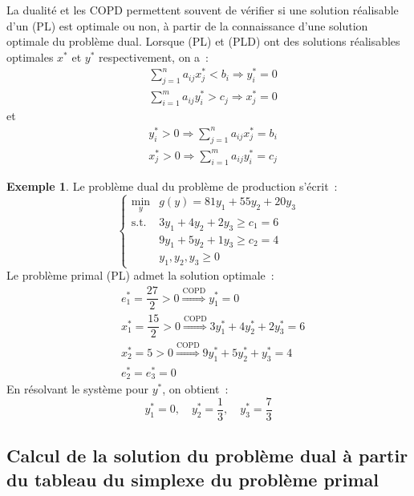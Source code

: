 \documentclass[a4paper,12pt,openany]{book}
\theoremstyle{plain}
\theoremstyle{definition}
\newtheorem{exemple}[theorem]{Exemple}
\theoremstyle{remark}
\theoremstyle{nbstyle}
\begin{document}
	La dualité et les COPD permettent souvent de vérifier si une solution réalisable d'un (PL) est optimale ou non, à partir de la connaissance d'une solution optimale du problème dual. Lorsque (PL) et (PLD) ont des solutions réalisables optimales $x^{*}$ et $y^{*}$ respectivement, on a~:
	\[
	\begin{aligned}
	& \displaystyle\sum_{j=1}^{n} a_{ij} x_{j}^{*} < b_{i} \Longrightarrow y_{i}^{*} = 0 \\
	& \displaystyle\sum_{i=1}^{m} a_{ij} y_{i}^{*} > c_{j} \Longrightarrow x_{j}^{*} = 0
	\end{aligned}
	\]
	et
	\[
	\begin{aligned}
	& y_{i}^{*} > 0 \Longrightarrow \displaystyle\sum_{j=1}^{n} a_{ij} x_{j}^{*} = b_{i} \\
	& x_{j}^{*} > 0 \Longrightarrow \displaystyle\sum_{i=1}^{m} a_{ij} y_{i}^{*} = c_{j}
	\end{aligned}
	\]
	
	\begin{exemple}
		Le problème dual du problème de production s'écrit~:
		\[
		\left\{
		\begin{array}{ll}
		\displaystyle\min_{y} & g(y) = 81 y_{1} + 55 y_{2} + 20 y_{3} \\
		\text{s.t.} & 3 y_{1} + 4 y_{2} + 2 y_{3} \geq c_{1} = 6 \\
		& 9 y_{1} + 5 y_{2} + 1 y_{3} \geq c_{2} = 4 \\
		& y_{1}, y_{2}, y_{3} \geq 0
		\end{array}
		\right.
		\]
		Le problème primal (PL) admet la solution optimale~:
		\[
		\begin{aligned}
		& e_{1}^{*} = \dfrac{27}{2} > 0 \stackrel{\text{COPD}}{\Longrightarrow} y_{1}^{*} = 0 \\
		& x_{1}^{*} = \dfrac{15}{2} > 0 \stackrel{\text{COPD}}{\Longrightarrow} 3 y_{1}^{*} + 4 y_{2}^{*} + 2 y_{3}^{*} = 6 \\
		& x_{2}^{*} = 5 > 0 \stackrel{\text{COPD}}{\Longrightarrow} 9 y_{1}^{*} + 5 y_{2}^{*} + y_{3}^{*} = 4 \\
		& e_{2}^{*} = e_{3}^{*} = 0
		\end{aligned}
		\]
		En résolvant le système pour $y^{*}$, on obtient~:
		\[
		y_{1}^{*} = 0, \quad y_{2}^{*} = \dfrac{1}{3}, \quad y_{3}^{*} = \dfrac{7}{3}
		\]
	\end{exemple}
	
	\subsection{Calcul de la solution du problème dual à partir du tableau du simplexe du problème primal}
	
\end{document}
